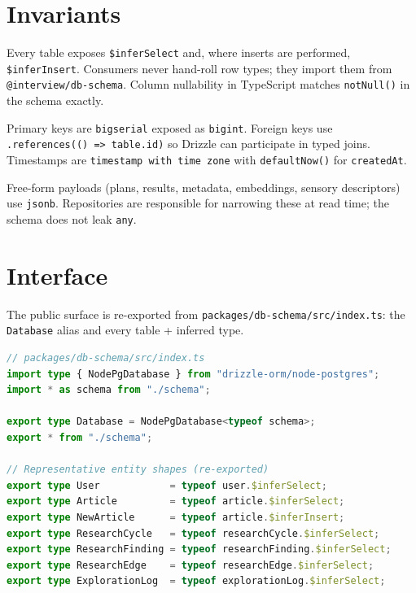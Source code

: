 \section{Invariants}
\begin{invariant}
Every table exposes \texttt{\$inferSelect} and, where inserts are performed,
\texttt{\$inferInsert}. Consumers never hand-roll row types; they import them
from \texttt{@interview/db-schema}. Column nullability in TypeScript matches
\texttt{notNull()} in the schema exactly.
\end{invariant}

\begin{invariant}
Primary keys are \texttt{bigserial} exposed as \texttt{bigint}. Foreign keys
use \texttt{.references(() => table.id)} so Drizzle can participate in typed
joins. Timestamps are \texttt{timestamp with time zone} with \texttt{defaultNow()}
for \texttt{createdAt}.
\end{invariant}

\begin{invariant}
Free-form payloads (plans, results, metadata, embeddings, sensory descriptors)
use \texttt{jsonb}. Repositories are responsible for narrowing these at read
time; the schema does not leak \texttt{any}.
\end{invariant}

\section{Interface}

The public surface is re-exported from \texttt{packages/db-schema/src/index.ts}:
the \texttt{Database} alias and every table + inferred type.

\begin{lstlisting}[language=TypeScript]
// packages/db-schema/src/index.ts
import type { NodePgDatabase } from "drizzle-orm/node-postgres";
import * as schema from "./schema";

export type Database = NodePgDatabase<typeof schema>;
export * from "./schema";

// Representative entity shapes (re-exported)
export type User            = typeof user.$inferSelect;
export type Article         = typeof article.$inferSelect;
export type NewArticle      = typeof article.$inferInsert;
export type ResearchCycle   = typeof researchCycle.$inferSelect;
export type ResearchFinding = typeof researchFinding.$inferSelect;
export type ResearchEdge    = typeof researchEdge.$inferSelect;
export type ExplorationLog  = typeof explorationLog.$inferSelect;
\end{lstlisting}

